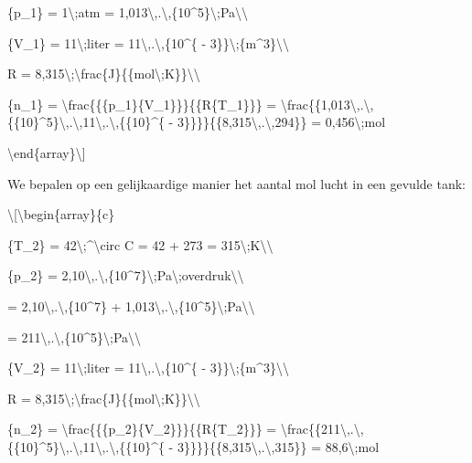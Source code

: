 \documentclass[]{article}
\begin{document}
\{p\_1\} = 1\textbackslash{};atm =
1,013\textbackslash{},.\textbackslash{},\{10\^{}5\}\textbackslash{};Pa\textbackslash{}\textbackslash{}

\{V\_1\} = 11\textbackslash{};liter =
11\textbackslash{},.\textbackslash{},\{10\^{}\{ -
3\}\}\textbackslash{};\{m\^{}3\}\textbackslash{}\textbackslash{}

R =
8,315\textbackslash{};\textbackslash{}frac\{J\}\{\{mol\textbackslash{};K\}\}\textbackslash{}\textbackslash{}

\{n\_1\} = \textbackslash{}frac\{\{\{p\_1\}\{V\_1\}\}\}\{\{R\{T\_1\}\}\}
=
\textbackslash{}frac\{\{1,013\textbackslash{},.\textbackslash{},\{\{10\}\^{}5\}\textbackslash{},.\textbackslash{},11\textbackslash{},.\textbackslash{},\{\{10\}\^{}\{
- 3\}\}\}\}\{\{8,315\textbackslash{},.\textbackslash{},294\}\} =
0,456\textbackslash{};mol

\textbackslash{}end\{array\}\textbackslash{}{]}

We bepalen op een gelijkaardige manier het aantal mol lucht in een
gevulde tank:

\textbackslash{}{[}\textbackslash{}begin\{array\}\{c\}

\{T\_2\} = 42\textbackslash{};\^{}\textbackslash{}circ C = 42 + 273 =
315\textbackslash{};K\textbackslash{}\textbackslash{}

\{p\_2\} =
2,10\textbackslash{},.\textbackslash{},\{10\^{}7\}\textbackslash{};Pa\textbackslash{};overdruk\textbackslash{}\textbackslash{}

= 2,10\textbackslash{},.\textbackslash{},\{10\^{}7\} +
1,013\textbackslash{},.\textbackslash{},\{10\^{}5\}\textbackslash{};Pa\textbackslash{}\textbackslash{}

=
211\textbackslash{},.\textbackslash{},\{10\^{}5\}\textbackslash{};Pa\textbackslash{}\textbackslash{}

\{V\_2\} = 11\textbackslash{};liter =
11\textbackslash{},.\textbackslash{},\{10\^{}\{ -
3\}\}\textbackslash{};\{m\^{}3\}\textbackslash{}\textbackslash{}

R =
8,315\textbackslash{};\textbackslash{}frac\{J\}\{\{mol\textbackslash{};K\}\}\textbackslash{}\textbackslash{}

\{n\_2\} = \textbackslash{}frac\{\{\{p\_2\}\{V\_2\}\}\}\{\{R\{T\_2\}\}\}
=
\textbackslash{}frac\{\{211\textbackslash{},.\textbackslash{},\{\{10\}\^{}5\}\textbackslash{},.\textbackslash{},11\textbackslash{},.\textbackslash{},\{\{10\}\^{}\{
- 3\}\}\}\}\{\{8,315\textbackslash{},.\textbackslash{},315\}\} =
88,6\textbackslash{};mol
\end{document}
